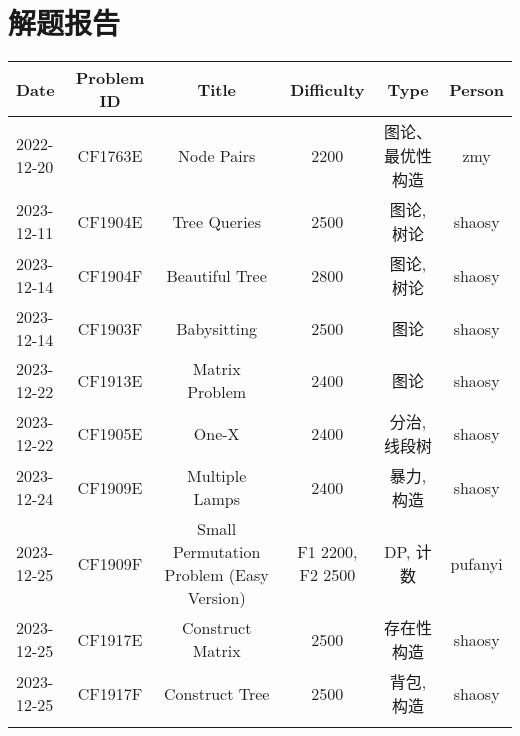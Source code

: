 \chapter{解题报告}
\begin{center}
\begin{longtable}{l c c c c c }

Date & Problem ID & Title & Difficulty & Type & Person   \\ 
\hline
2022-12-20 & CF1763E & Node Pairs & 2200 & 图论、最优性构造 & zmy  \\
2023-12-11 & CF1904E & Tree Queries & 2500 & 图论, 树论 & shaosy \\
2023-12-14 & CF1904F & Beautiful Tree & 2800 & 图论, 树论 & shaosy \\
2023-12-14 & CF1903F & Babysitting & 2500 & 图论 & shaosy \\
2023-12-22 & CF1913E & Matrix Problem & 2400 & 图论 & shaosy \\
2023-12-22 & CF1905E & One-X & 2400 & 分治, 线段树 & shaosy \\
2023-12-24 & CF1909E & Multiple Lamps & 2400 & 暴力, 构造 & shaosy \\
2023-12-25 & CF1909F & Small Permutation Problem (Easy Version) & F1 2200, F2 2500 & DP, 计数 & pufanyi \\
2023-12-25 & CF1917E & Construct Matrix & 2500 & 存在性构造 & shaosy \\
2023-12-25 & CF1917F & Construct Tree & 2500 & 背包, 构造 & shaosy \\
\hline

\label{tab:practice_index}
\end{longtable}
\end{center}


